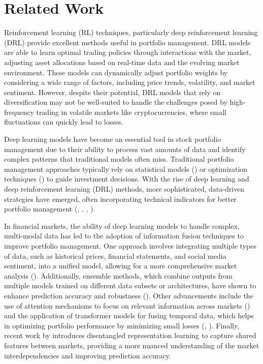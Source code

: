 \section{Related Work}

Reinforcement learning (RL) techniques, particularly deep reinforcement learning (DRL) provide excellent methods useful in portfolio management. DRL models are able to learn optimal trading policies through interactions with the market, adjusting asset allocations based on real-time data and the evolving market environment. These models can dynamically adjust portfolio weights by considering a wide range of factors, including price trends, volatility, and market sentiment. However, despite their potential, DRL models that rely on diversification may not be well-suited to handle the challenges posed by high-frequency trading in volatile markets like cryptocurrencies, where small fluctuations can quickly lead to losses.


Deep learning models have become an essential tool in stock portfolio management due to their ability to process vast amounts of data and identify complex patterns that traditional models often miss. Traditional portfolio management approaches typically rely on statistical models (\citet{li2012pamr}) or optimization techniques (\citet{pennanen2012introduction}) to guide investment decisions. With the rise of deep learning and deep reinforcement learning (DRL) methods, more sophisticated, data-driven strategies have emerged, often incorporating technical indicators for better portfolio management (\citet{ayala2021technical}, \citet{agrawal2022stock}, \citet{taghian2021reinforcement}, \citet{taghian2022learning}).

In financial markets, the ability of deep learning models to handle complex, multi-modal data has led to the adoption of information fusion techniques to improve portfolio management. One approach involves integrating multiple types of data, such as historical prices, financial statements, and social media sentiment, into a unified model, allowing for a more comprehensive market analysis (\citet{asadi4423354multi}). Additionally, ensemble methods, which combine outputs from multiple models trained on different data subsets or architectures, have shown to enhance prediction accuracy and robustness (\citet{carta2021multi}). Other advancements include the use of attention mechanisms to focus on relevant information across markets (\citet{zhao2022stock}) and the application of transformer models for fusing temporal data, which helps in optimizing portfolio performance by minimizing small losses (\citet{gullotto2021portfolio}, \citet{kisiel2022portfolio}). Finally, recent work by \citet{abdulsahib2024cross} introduces disentangled representation learning to capture shared features between markets, providing a more nuanced understanding of the market interdependencies and improving prediction accuracy.

